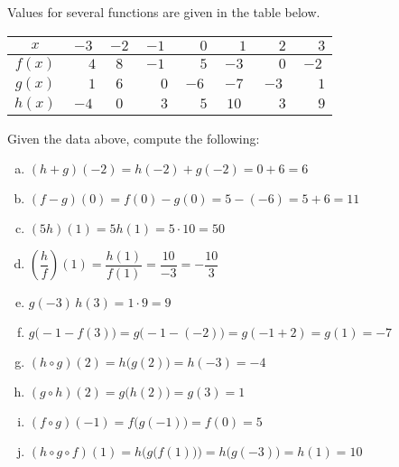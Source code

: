 \documentclass[11pt,letterpaper]{article}
\begin{document}

 Values for several functions are given in the table below. 
        \begin{table}[!ht]
        \centering
        \begin{tabular}{| c || c | c | c | c | c | c | c |} \hline
	$x$ & $-3$ & $-2$ & $-1$ & $\phantom{-}0$ & $\phantom{-}1$ & $\phantom{-}2$ & $\phantom{-}3$ \\ \hline \hline
	$f(x)$ & $\phantom{-}4$ & $8$ & $-1$ & $\phantom{-}5$ & $-3$ & $\phantom{-}0$ & $-2$ \\ \hline
	$g(x)$ & $\phantom{-}1$ & $6$ & $\phantom{-}0$ & $-6$ & $-7$ & $-3$ & $\phantom{-}1$ \\ \hline
	$h(x)$ & $-4$ & $0$ & $\phantom{-}3$ & $\phantom{-}5$ & $10$ & $\phantom{-}3$ & $\phantom{-}9$ \\ \hline
        \end{tabular}
        \end{table}

Given the data above, compute the following: 
        \begin{enumerate}[(a)]
        \item $(h + g)(-2)= h(-2) + g(-2)= 0 + 6= 6$ \vfill
        \item $(f - g)(0)= f(0) - g(0)= 5 - (-6)= 5 + 6= 11$ \vfill
        \item $(5h)(1)= 5h(1)= 5 \cdot 10= 50$ \vfill
        \item $\left(\dfrac{h}{f}\right)(1)= \dfrac{h(1)}{f(1)}= \dfrac{10}{-3}= -\dfrac{10}{3}$ \vfill
        \item $g(-3)\, h(3)= 1 \cdot 9= 9$ \vfill
        \item $g \big(-1 - f(3) \big)= g\big(-1 - (-2) \big)= g(-1 + 2)= g(1)= -7$ \vfill
        \item $(h \circ g)(2)= h \big( g(2) \big)= h(-3)= -4$ \vfill
	\item $(g \circ h)(2)= g \big( h(2) \big)= g(3)= 1$ \vfill
        \item $(f \circ g)(-1)= f \big( g(-1) \big)= f(0)= 5$ \vfill
	\item $(h \circ g \circ f)(1)= h \big( g \big( f(1) \big) \big)= h \big( g(-3) \big)= h(1)= 10$ \vfill
        \end{enumerate}



\newpage
\end{document}
